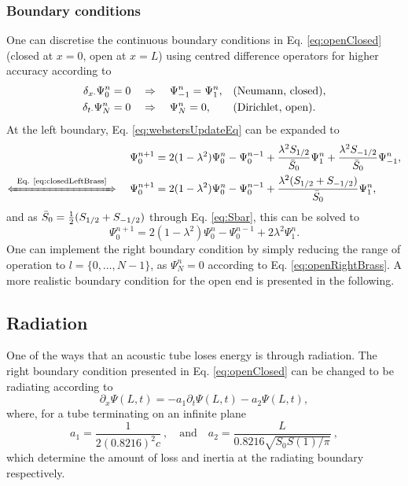 \subsubsection{Boundary conditions}
One can discretise the continuous boundary conditions in Eq. \eqref{eq:openClosed} (closed at $x=0$, open at $x=L$) using centred difference operators for higher accuracy according to
\begin{subequations}\label{eq:discBoundariesBrass}
    \begin{align}
        \dxd\Psi_0^n &= 0 \quad \Rightarrow \quad\Psi_{-1}^n = \Psi_1^n ,\quad \!\!\!\!\!\!&&\text{(Neumann, closed)}, \label{eq:closedLeftBrass}\\
        \dtd\Psi_N^n &= 0\quad\Rightarrow \quad \Psi_N^n = 0, \quad \!\!\!\!\!\!&&\text{(Dirichlet, open)}\label{eq:openRightBrass}.
    \end{align}
\end{subequations} 
At the left boundary, Eq. \eqref{eq:webstersUpdateEq} can be expanded to
\begin{equation*}
    \begin{aligned}
        \Psi_0^{n+1} &= 2(1-\lambda^2)\Psi_0^n-\Psi_0^{n-1}+ \frac{\lambda^2S_{1/2}}{\bar S_0}\Psi_1^n + \frac{\lambda^2S_{-1/2}}{\bar S_0}\Psi_{-1}^n,\\[-0.5em]
        \xLeftrightarrow{\mystrut\ \text{Eq. \eqref{eq:closedLeftBrass}}\ }\quad\Psi_0^{n+1} &= 2(1-\lambda^2)\Psi_0^n-\Psi_0^{n-1}+ \frac{\lambda^2(S_{1/2}+S_{-1/2})}{\bar S_0}\Psi_1^n,
    \end{aligned}
\end{equation*}
and as $\bar{S}_0 = \frac{1}{2}(S_{1/2}+S_{-1/2})$ through Eq. \eqref{eq:Sbar}, this can be solved to
\begin{equation}\label{eq:leftBoundaryWebster}
    \Psi_0^{n+1} = 2(1-\lambda^2)\Psi_0^n-\Psi_0^{n-1}+ 2\lambda^2\Psi_1^n.
\end{equation}
One can implement the right boundary condition by simply reducing the range of operation to $l = \{0, \hdots, N-1\}$, as $\Psi_N^n = 0$ according to Eq. \eqref{eq:openRightBrass}. A more realistic boundary condition for the open end is presented in the following.

\subsection{Radiation}\label{sec:radiating}
One of the ways that an acoustic tube loses energy is through radiation. The right boundary condition presented in Eq. \eqref{eq:openClosed} can be changed to be radiating according to \cite{theBible}
\begin{equation}\label{eq:radCont}
    \partial_x\Psi(L,t) = -a_1\partial_t\Psi(L,t)-a_2\Psi(L,t),
\end{equation}
where, for a tube terminating on an infinite plane \cite{Atig2004}
\begin{equation}
    a_1 = \frac{1}{2(0.8216)^2c}\ , \quad \text{and} \quad a_2 = \frac{L}{0.8216\sqrt{S_0S(1)/\pi}}\ ,
\end{equation}
which determine the amount of loss and inertia at the radiating boundary respectively. 

